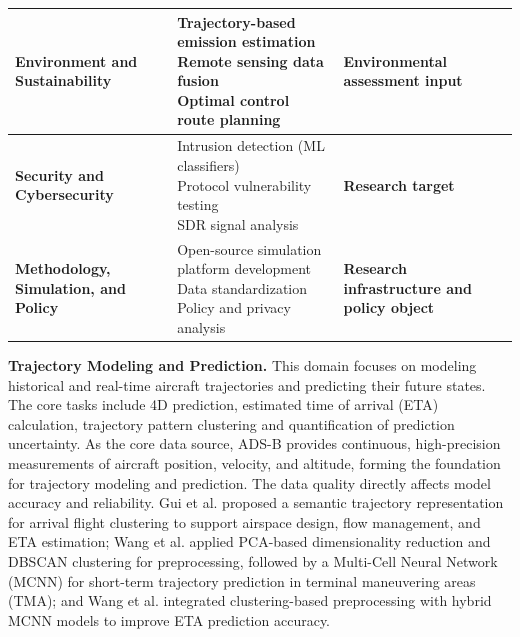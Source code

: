\begin{table}[h]
\begin{tabular}{p{3cm} p{6cm} p{3cm}}
		\textbf{Environment and Sustainability} &
		\makecell[l]{
			Trajectory-based emission estimation\\
			Remote sensing data fusion\\
			Optimal control route planning
		} &
		\textbf{Environmental assessment input} \\
		\hline
		
		\textbf{Security and Cybersecurity} &
		\makecell[l]{
			Intrusion detection (ML classifiers)\\
			Protocol vulnerability testing\\
			SDR signal analysis
		} &
		\textbf{Research target} \\
		\hline
		
		\textbf{Methodology, Simulation, and Policy} &
		\makecell[l]{
			Open-source simulation platform development\\
			Data standardization\\
			Policy and privacy analysis
		} &
		\textbf{Research infrastructure and policy object} \\
		\hline
	\end{tabular}
	\label{tab:adsb_applications}
\end{table}

\textbf{Trajectory Modeling and Prediction.} 
This domain focuses on modeling historical and real-time aircraft trajectories and predicting their future states. The core tasks include 4D prediction, estimated time of arrival (ETA) calculation, trajectory pattern clustering and quantification of prediction uncertainty. As the core data source, ADS-B provides continuous, high-precision measurements of aircraft position, velocity, and altitude, forming the foundation for trajectory modeling and prediction. The data quality directly affects model accuracy and reliability. Gui et al. \cite{xuhao2021trajectory} proposed a semantic trajectory representation for arrival flight clustering to support airspace design, flow management, and ETA estimation; Wang et al. \cite{wang2017short} applied PCA-based dimensionality reduction and DBSCAN clustering for preprocessing, followed by a Multi-Cell Neural Network (MCNN) for short-term trajectory prediction in terminal maneuvering areas (TMA); and Wang et al. \cite{wang2018hybrid} integrated clustering-based preprocessing with hybrid MCNN models to improve ETA prediction accuracy.

